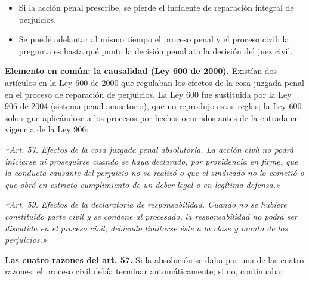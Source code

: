 \begin{itemize}
\item Si la acción penal prescribe, se pierde el incidente de reparación integral de perjuicios.
\item Se puede adelantar al mismo tiempo el proceso penal y el proceso civil; la pregunta es hasta qué punto la decisión penal ata la decisión del juez civil.
\end{itemize}
\textbf{Elemento en común: la causalidad (Ley 600 de 2000).} Existían dos artículos en la Ley 600 de 2000 que regulaban los efectos de la cosa juzgada penal en el proceso de reparación de perjuicios. La Ley 600 fue sustituida por la Ley 906 de 2004 (sistema penal acusatorio), que no reprodujo estas reglas; la Ley 600 solo sigue aplicándose a los procesos por hechos ocurridos antes de la entrada en vigencia de la Ley 906:

\begin{cita}
\textit{«Art. 57. Efectos de la cosa juzgada penal absolutoria. La acción civil no podrá iniciarse ni proseguirse cuando se haya declarado, por providencia en firme, que la conducta causante del perjuicio no se realizó o que el sindicado no lo cometió o que obró en estricto cumplimiento de un deber legal o en legítima defensa.»}
\par
\textit{«Art. 59. Efectos de la declaratoria de responsabilidad. Cuando no se hubiere constituido parte civil y se condene al procesado, la responsabilidad no podrá ser discutida en el proceso civil, debiendo limitarse éste a la clase y monto de los perjuicios.»}
\end{cita}
\textbf{Las cuatro razones del art. 57.} Si la absolución se daba por una de las cuatro razones, el proceso civil debía terminar automáticamente; si no, continuaba:


